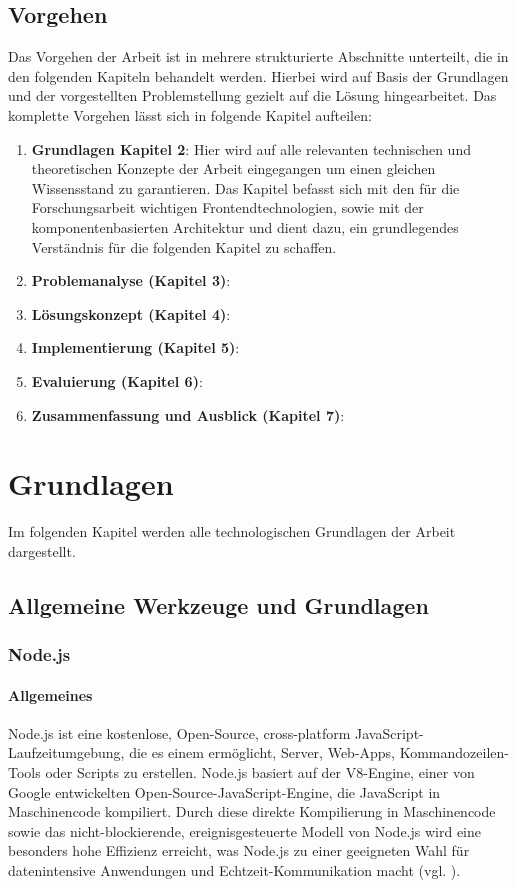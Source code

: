 \documentclass[oneside]{ausarbeitung}
\begin{document}
\section{Vorgehen}
\label{sec:vorgehen}

Das Vorgehen der Arbeit ist in mehrere strukturierte Abschnitte unterteilt, die in den folgenden Kapiteln behandelt werden. Hierbei wird auf Basis der Grundlagen und der vorgestellten Problemstellung gezielt auf die Lösung hingearbeitet. 
Das komplette Vorgehen lässt sich in folgende Kapitel aufteilen: 

\begin{enumerate}  
	\item \textbf{Grundlagen Kapitel 2}: Hier wird auf alle relevanten technischen und theoretischen Konzepte der Arbeit eingegangen um einen gleichen Wissensstand zu garantieren. Das Kapitel befasst sich mit den für die Forschungsarbeit wichtigen Frontendtechnologien, sowie mit der komponentenbasierten Architektur und dient dazu, ein grundlegendes Verständnis für die folgenden Kapitel zu schaffen. 
    \item \textbf{Problemanalyse (Kapitel 3)}: 
    \item \textbf{Lösungskonzept (Kapitel 4)}: 
    \item \textbf{Implementierung (Kapitel 5)}: 
    \item \textbf{Evaluierung (Kapitel 6)}:   
    \item \textbf{Zusammenfassung und Ausblick (Kapitel 7)}:	
\end{enumerate}  
\chapter{Grundlagen}
\label{chap:grundlagen}

Im folgenden Kapitel werden alle technologischen Grundlagen der Arbeit dargestellt.

\section{Allgemeine Werkzeuge und Grundlagen}
\subsection{Node.js}
\subsubsection{Allgemeines}
Node.js ist eine kostenlose, Open-Source, cross-platform JavaScript-Laufzeitumgebung, die es einem ermöglicht, Server, Web-Apps, Kommandozeilen-Tools oder Scripts zu erstellen. Node.js basiert auf der V8-Engine, einer von Google entwickelten Open-Source-JavaScript-Engine, die JavaScript in Maschinencode kompiliert. Durch diese direkte Kompilierung in Maschinencode sowie das nicht-blockierende, ereignisgesteuerte Modell von Node.js wird eine besonders hohe Effizienz erreicht, was Node.js zu einer geeigneten Wahl für datenintensive Anwendungen und Echtzeit-Kommunikation macht (vgl. \parencite{nodejs}).
\end{document}
